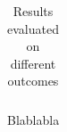 \documentclass[preprint]{elsarticle}
\begin{document}
\begin{table}[H]
\begin{adjustbox}{center}
\begin{tabular}{@{}llcccc@{}}
\bottomrule
\end{tabular}
\end{adjustbox}
\caption{Results evaluated on different outcomes}
\medskip
\small
Blablabla
\label{table:appendix:outcomes}
\end{table}
\renewcommand{\arraystretch}{1}
\end{document}
